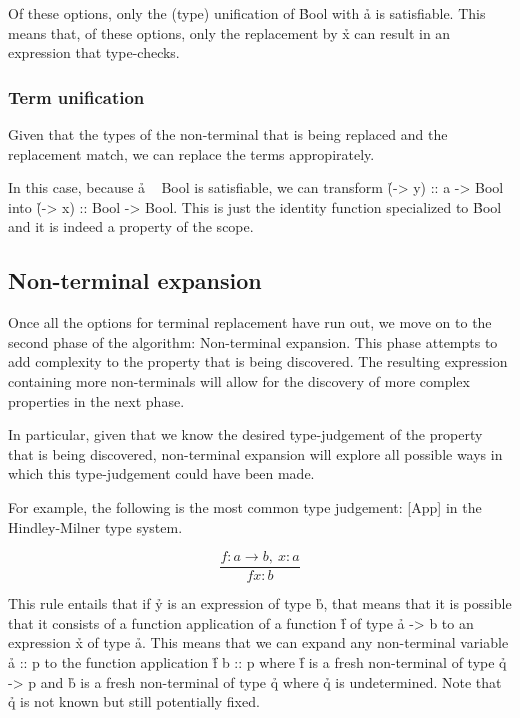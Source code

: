 \documentclass[a4paper, 11pt, onepage]{article}
\begin{document}
Of these options, only the (type) unification of \h{Bool} with \h{a} is satisfiable.
This means that, of these options, only the replacement by \h{x} can result in an expression that type-checks.


\subsubsection{Term unification}

Given that the types of the non-terminal that is being replaced and the replacement match, we can replace the terms appropirately.

In this case, because \h{a ~ Bool} is satisfiable, we can transform \h{(\x -> y) :: a -> Bool} into \h{(\x -> x) :: Bool -> Bool}.
This is just the identity function specialized to \h{Bool} and it is indeed a property of the scope.


\subsection{Non-terminal expansion}

Once all the options for terminal replacement have run out, we move on to the second phase of the algorithm: Non-terminal expansion.
This phase attempts to add complexity to the property that is being discovered.
The resulting expression containing more non-terminals will allow for the discovery of more complex properties in the next phase.

In particular, given that we know the desired type-judgement of the property that is being discovered,
non-terminal expansion will explore all possible ways in which this type-judgement could have been made.

For example, the following is the most common type judgement:
[App] in the Hindley-Milner type system. 

\[
  \frac{f : a \rightarrow b,\ x : a}{f x : b}
\]

This rule entails that if \h{y} is an expression of type \h{b}, that means that it is possible that it consists of a function application of a function \h{f} of type \h{a -> b} to an expression \h{x} of type \h{a}.
This means that we can expand any non-terminal variable \h{a :: p} to the function application \h{f b :: p} where \h{f} is a fresh non-terminal of type \h{q -> p} and \h{b} is a fresh non-terminal of type \h{q} where \h{q} is undetermined.
Note that \h{q} is not known but still potentially fixed.
\end{document}
